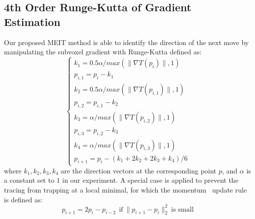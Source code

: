\documentclass[conference]{IEEEtran}
\begin{document}
\subsection{4th Order Runge-Kutta of Gradient Estimation}
\label{ssec:4rk}

Our proposed MEIT method is able to identify the direction of the next move by manipulating the subvoxel gradient with Runge-Kutta \cite{r1_2} defined as: 
\begin{equation}
\begin{cases}
k_1 = 0.5\alpha / max(\|\nabla T(p_i)\|, 1)\\
p_{i,1} = p_i - k_1\\
k_2 = 0.5\alpha / max(\|\nabla T(p_{i,1})\|, 1)\\
p_{i,2} = p_{i,1} - k_2\\
k_3 = \alpha / max(\|\nabla T(p_{i,2})\|, 1)\\
p_{i,3} = p_{i,2} - k_3\\
k_4 = \alpha / max(\|\nabla T(p_{i,3})\|, 1)\\
p_{i+1} = p_i - (k_1 + 2k_2 + 2k_3 + k_4)/6
\end{cases}
\label{RK4}
\end{equation}
where $k_1,k_2,k_3,k_4$ are the direction vectors at the corresponding point $p$, and $\alpha$ is a constant set to $1$ in our experiment. A special case is applied to prevent the tracing from trapping at a local minimal, for which the momentum~\cite{r2} update rule is defined as: 
\begin{equation}
p_{i+1} = 2p_i - p_{i-2}~~\text{if}~\|p_{i+1} - p_i\|_2^2 ~\text{is small}
\end{equation}
\end{document}
